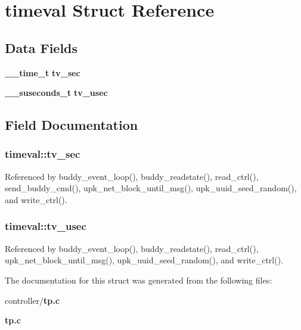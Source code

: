 \section{timeval Struct Reference}
\label{structtimeval}
\subsection*{Data Fields}
\begin{DoxyCompactItemize}
\item 
{\bf \_\-\_\-time\_\-t} {\bf tv\_\-sec}
\item 
{\bf \_\-\_\-suseconds\_\-t} {\bf tv\_\-usec}
\end{DoxyCompactItemize}


\subsection{Field Documentation}
\subsubsection[{tv\_\-sec}]{ {\bf timeval::tv\_\-sec}}\label{structtimeval_a33c19839180ed049b0419f680f5c37ad}


Referenced by buddy\_\-event\_\-loop(), buddy\_\-readstate(), read\_\-ctrl(), send\_\-buddy\_\-cmd(), upk\_\-net\_\-block\_\-until\_\-msg(), upk\_\-uuid\_\-seed\_\-random(), and write\_\-ctrl().

\subsubsection[{tv\_\-usec}]{ {\bf timeval::tv\_\-usec}}\label{structtimeval_a6792d43e50db57fb38f7b31d48d105ad}


Referenced by buddy\_\-event\_\-loop(), buddy\_\-readstate(), read\_\-ctrl(), upk\_\-net\_\-block\_\-until\_\-msg(), upk\_\-uuid\_\-seed\_\-random(), and write\_\-ctrl().



The documentation for this struct was generated from the following files:\begin{DoxyCompactItemize}
\item 
controller/{\bf tp.c}\item 
{\bf tp.c}\end{DoxyCompactItemize}

